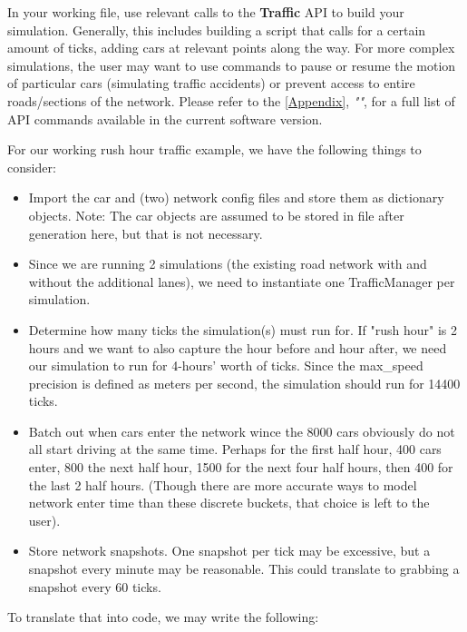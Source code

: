 \par In your working file, use relevant calls to the \textbf{Traffic} API to build your simulation.  Generally, this includes building a script that calls for a certain amount of ticks, adding cars at relevant points along the way.  For more complex simulations, the user may want to use commands to pause or resume the motion of particular cars (simulating traffic accidents) or prevent access to entire roads/sections of the network.  Please refer to the \autoref{Appendix}, \textit{""}, for a full list of API commands available in the current software version. \\

\par For our working rush hour traffic example, we have the following things to consider:

\begin{itemize}
    \item Import the car and (two) network config files and store them as dictionary objects.  Note:  The car objects are assumed to be stored in file after generation here, but that is not necessary.
    \item Since we are running 2 simulations (the existing road network with and without the additional lanes), we need to instantiate one TrafficManager per simulation.
    \item Determine how many ticks the simulation(s) must run for.  If "rush hour" is 2 hours and we want to also capture the hour before and hour after, we need our simulation to run for 4-hours' worth of ticks.  Since the max\_speed precision is defined as meters per second, the simulation should run for 14400 ticks.
    \item Batch out when cars enter the network wince the 8000 cars obviously do not all start driving at the same time.  Perhaps for the first half hour, 400 cars enter, 800 the next half hour, 1500 for the next four half hours, then 400 for the last 2 half hours. (Though there are more accurate ways to model network enter time than these discrete buckets, that choice is left to the user).
    \item Store network snapshots.  One snapshot per tick may be excessive, but a snapshot every minute may be reasonable.  This could translate to grabbing a snapshot every 60 ticks.
\end{itemize}

\noindent To translate that into code, we may write the following:

